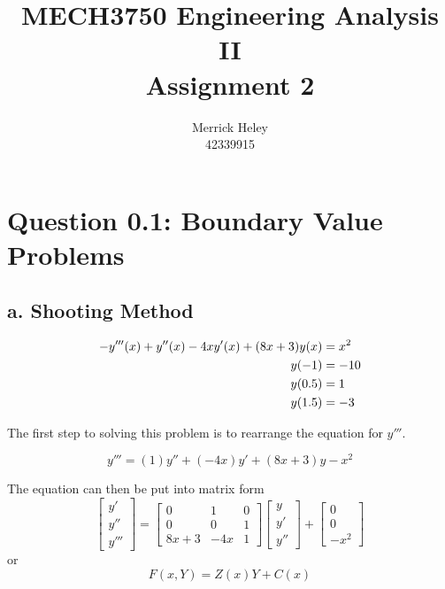 \documentclass[a4paper,11pt,titlepage]{article}
\title{
MECH3750 Engineering Analysis II \\ 
Assignment 2
}
\author{
Merrick Heley\\
42339915
}
\begin{document}
\maketitle

\section*{Question 0.1: Boundary Value Problems}
\subsection*{a. Shooting Method}

\begin{align}
-y'''(x) + y''(x) - 4xy'(x) + (8x + 3)y(x) &= x^2 \label{eq:q1bvp}\\
y(-1) & = -10 \notag\\
y(0.5) & = 1 \notag\\
y(1.5) & = -3 \notag
\end{align}

The first step to solving this problem is to rearrange the equation for $y'''$.

\begin{equation}
y''' = (1)y'' + (-4x)y' + (8x + 3)y - x^2
\end{equation}

The equation can then be put into matrix form
\begin{equation}
\begin{bmatrix}
y' \\
y'' \\
y'''
\end{bmatrix}
=
\begin{bmatrix}
    0       &   1       &   0 \\
    0       &   0       &   1 \\
    8x+3    &   -4x     &   1
\end{bmatrix}
\begin{bmatrix}
y \\
y' \\
y''
\end{bmatrix}
+
\begin{bmatrix}
0 \\
0 \\
-x^2
\end{bmatrix}\label{eq:rk4mat}
\end{equation}
or
\begin{equation}
F(x, Y) = Z(x)Y + C(x) \label{eq:rk4func}
\end{equation}
\end{document}
